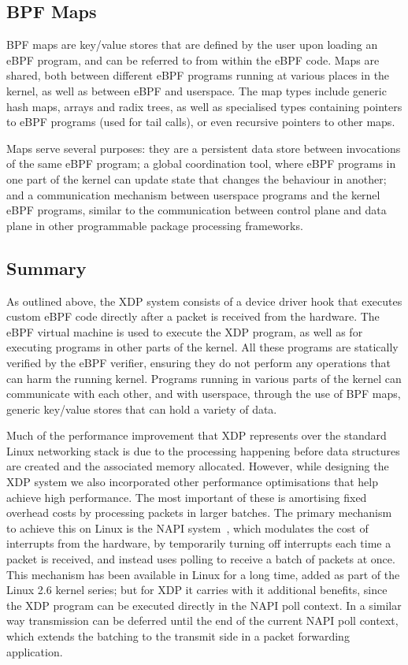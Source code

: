 \documentclass[10pt,sigconf]{acmart}
\begin{document}
\subsection{BPF Maps}
\label{sec:bpf-maps}

BPF maps are key/value stores that are defined by the user upon loading an eBPF
program, and can be referred to from within the eBPF code. Maps are shared, both
between different eBPF programs running at various places in the kernel, as well
as between eBPF and userspace. The map types include generic hash maps, arrays
and radix trees, as well as specialised types containing pointers to eBPF
programs (used for tail calls), or even recursive pointers to other maps.

Maps serve several purposes: they are a persistent data store between
invocations of the same eBPF program; a global coordination tool, where eBPF
programs in one part of the kernel can update state that changes the behaviour
in another; and a communication mechanism between userspace programs and the
kernel eBPF programs, similar to the communication between control plane and
data plane in other programmable package processing frameworks.


\subsection{Summary}
\label{sec:design-summary}

As outlined above, the XDP system consists of a device driver hook that executes
custom eBPF code directly after a packet is received from the hardware. The eBPF
virtual machine is used to execute the XDP program, as well as for executing
programs in other parts of the kernel. All these programs are statically
verified by the eBPF verifier, ensuring they do not perform any operations that
can harm the running kernel. Programs running in various parts of the kernel can
communicate with each other, and with userspace, through the use of BPF maps,
generic key/value stores that can hold a variety of data.

Much of the performance improvement that XDP represents over the standard Linux
networking stack is due to the processing happening before data structures are
created and the associated memory allocated. However, while designing the XDP
system we also incorporated other performance optimisations that help achieve
high performance. The most important of these is amortising fixed overhead costs
by processing packets in larger batches. The primary mechanism to achieve this
on Linux is the NAPI system~\cite{napi}, which modulates the cost of interrupts
from the hardware, by temporarily turning off interrupts each time a packet is
received, and instead uses polling to receive a batch of packets at once. This
mechanism has been available in Linux for a long time, added as part of the
Linux 2.6 kernel series; but for XDP it carries with it additional benefits,
since the XDP program can be executed directly in the NAPI poll context. In a
similar way transmission can be deferred until the end of the current NAPI poll
context, which extends the batching to the transmit side in a packet forwarding
application.
\end{document}
